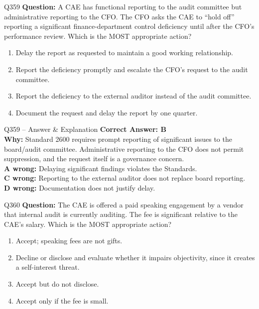 \documentclass[aspectratio=169,10pt]{beamer}
\begin{document}
	\begin{frame}[t]{Q359}
		\small
		\textbf{Question:} A CAE has functional reporting to the audit committee but administrative reporting to the CFO. The CFO asks the CAE to ``hold off'' reporting a significant finance-department control deficiency until after the CFO's performance review. Which is the MOST appropriate action?
		\begin{enumerate}[label=\Alph*.,itemsep=1pt,topsep=2pt]
			\item Delay the report as requested to maintain a good working relationship.
			\item Report the deficiency promptly and escalate the CFO's request to the audit committee.
			\item Report the deficiency to the external auditor instead of the audit committee.
			\item Document the request and delay the report by one quarter.
		\end{enumerate}
	\end{frame}
	
	\begin{frame}[t]{Q359 -- Answer \& Explanation}
		\small
		\textbf{Correct Answer: B} \\[4pt]
		\textbf{Why:} Standard 2600 requires prompt reporting of significant issues to the board/audit committee. Administrative reporting to the CFO does not permit suppression, and the request itself is a governance concern. \\[4pt]
		\textbf{A wrong:} Delaying significant findings violates the Standards. \\[2pt]
		\textbf{C wrong:} Reporting to the external auditor does not replace board reporting. \\[2pt]
		\textbf{D wrong:} Documentation does not justify delay.
	\end{frame}
	
	\begin{frame}[t]{Q360}
		\small
		\textbf{Question:} The CAE is offered a paid speaking engagement by a vendor that internal audit is currently auditing. The fee is significant relative to the CAE's salary. Which is the MOST appropriate action?
		\begin{enumerate}[label=\Alph*.,itemsep=1pt,topsep=2pt]
			\item Accept; speaking fees are not gifts.
			\item Decline or disclose and evaluate whether it impairs objectivity, since it creates a self-interest threat.
			\item Accept but do not disclose.
			\item Accept only if the fee is small.
		\end{enumerate}
	\end{frame}
	
\end{document}
